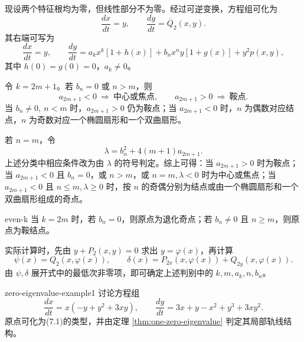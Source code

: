 
现设两个特征根均为零，但线性部分不为零。经过可逆变换，方程组可化为
\[
\dfrac{dx}{dt}=y,\qquad \dfrac{dy}{dt}=\overline Q_2(x,y).
\tag{7.6}
\]
其右端可写为
\[
\dfrac{dx}{dt}=y,\qquad
\dfrac{dy}{dt}=a_kx^k[1+h(x)]
+b_nx^ny[1+g(x)]+y^2p(x,y),
\tag{7.7}
\]
其中 $h(0)=g(0)=0$，$a_k\ne0$。

令 $k=2m+1$。若 $b_n=0$ 或 $n>m$，则
\[
a_{2m+1}<0\ \Longrightarrow\ \text{中心或焦点},\qquad
a_{2m+1}>0\ \Longrightarrow\ \text{鞍点}.
\]
当 $b_n\ne0,\ n<m$ 时，$a_{2m+1}>0$ 仍为鞍点；当 $a_{2m+1}<0$ 时，$n$ 为偶数对应结点，$n$ 为奇数对应一个椭圆扇形和一个双曲扇形。


若 $n=m$，令
\[
\lambda=b_n^2+4(m+1)a_{2m+1}.
\]
上述分类中相应条件改为由 $\lambda$ 的符号判定。综上可得：当 $a_{2m+1}>0$ 时为鞍点；当 $a_{2m+1}<0$ 且 $b_n=0$，或 $n>m$，或 $n=m,\lambda<0$ 时为中心或焦点；当 $a_{2m+1}<0$ 且 $n\le m,\lambda\ge0$ 时，按 $n$ 的奇偶分别为结点或由一个椭圆扇形和一个双曲扇形组成的奇点。


\begin{theorem}{}{even-k}
当 $k=2m$ 时，若 $b_n=0$，则原点为退化奇点；若 $b_n\ne0$ 且 $n\ge m$，则原点为鞍结点。
\end{theorem}


实际计算时，先由 $y+P_2(x,y)=0$ 求出 $y=\varphi(x)$，再计算
\[
\psi(x)=Q_2(x,\varphi(x)),\qquad
\delta(x)=P_{2x}(x,\varphi(x))+Q_{2y}(x,\varphi(x)).
\]
由 $\psi,\delta$ 展开式中的最低次非零项，即可确定上述判别中的 $k,m,a_k,n,b_n$。

\begin{example}{}{zero-eigenvalue-example1}
讨论方程组
\[
\dfrac{dx}{dt}=x(-y+y^2+3xy),\qquad
\dfrac{dy}{dt}=3x+y-x^2+y^3+3xy^2.
\]
原点可化为(7.1)的类型，并由定理 \ref{thm:one-zero-eigenvalue} 判定其局部轨线结构。
\end{example}

